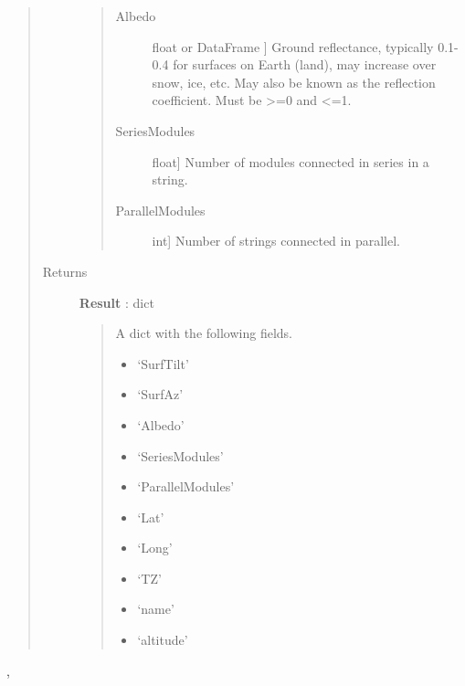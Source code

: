 \documentclass[letterpaper,10pt,english]{sphinxmanual}
\begin{document}
\begin{fulllineitems}
\begin{quote}
\begin{description}
\begin{quote}
\begin{description}
\item[{Albedo}] \leavevmode{[}float or DataFrame {]}
Ground reflectance, typically 0.1-0.4 for
surfaces on Earth (land), may increase over snow, ice, etc. May also 
be known as the reflection coefficient. Must be \textgreater{}=0 and \textless{}=1.

\item[{SeriesModules}] \leavevmode{[}float{]}
Number of modules connected in series in a string.

\item[{ParallelModules}] \leavevmode{[}int{]}
Number of strings connected in parallel.

\end{description}
\end{quote}

\item[{Returns}] \leavevmode
\textbf{Result} : dict
\begin{quote}

A dict with the following fields.
\begin{itemize}
\item {} 
`SurfTilt'

\item {} 
`SurfAz'

\item {} 
`Albedo'

\item {} 
`SeriesModules'

\item {} 
`ParallelModules'

\item {} 
`Lat'

\item {} 
`Long'

\item {} 
`TZ'

\item {} 
`name'

\item {} 
`altitude'

\end{itemize}
\end{quote}

\end{description}\end{quote}




{\hyperref[stubs/pvlib.pvl_readtmy3:pvlib.pvl_readtmy3]{}}, {\hyperref[stubs/pvlib.pvl_readtmy2:pvlib.pvl_readtmy2]{}}



\end{fulllineitems}
\end{document}
